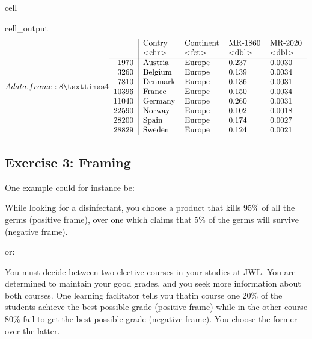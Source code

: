 \documentclass[letterpaper,10pt,english]{jupyterBook}
\begin{document}
\begin{sphinxuseclass}{cell}
\begin{sphinxVerbatimOutput}
\begin{sphinxuseclass}{cell_output}\begin{equation*}
\begin{split}A data.frame: 8 × 4
\begin{tabular}{r|llll}
  & Contry & Continent & MR-1860 & MR-2020\\
  & <chr> & <fct> & <dbl> & <dbl>\\
\hline
	1970 & Austria & Europe & 0.237 & 0.0030\\
	3260 & Belgium & Europe & 0.139 & 0.0034\\
	7810 & Denmark & Europe & 0.136 & 0.0031\\
	10396 & France  & Europe & 0.150 & 0.0034\\
	11040 & Germany & Europe & 0.260 & 0.0031\\
	22590 & Norway  & Europe & 0.102 & 0.0018\\
	28200 & Spain   & Europe & 0.174 & 0.0027\\
	28829 & Sweden  & Europe & 0.124 & 0.0021\\
\end{tabular}\end{split}
\end{equation*}
\end{sphinxuseclass}\end{sphinxVerbatimOutput}

\end{sphinxuseclass}

\subsection{Exercise 3: Framing}
\label{\detokenize{exercises_unit_1:exercise-3-framing}}
\sphinxAtStartPar
One example could for instance be:

\sphinxAtStartPar
While looking for a disinfectant, you choose a product that kills 95\% of all the germs (positive frame), over one which claims that 5\% of the germs will survive (negative frame).

\sphinxAtStartPar
or:

\sphinxAtStartPar
You must decide between two elective courses in your studies at JWL. You are determined to maintain your
good grades, and you seek more information about both courses. One learning faclitator tells you thatin course one 20\% of the students achieve the best possible grade (positive frame) while in the other course 80\% fail to get the best possible grade (negative frame). You choose the former over the latter.
\end{document}
